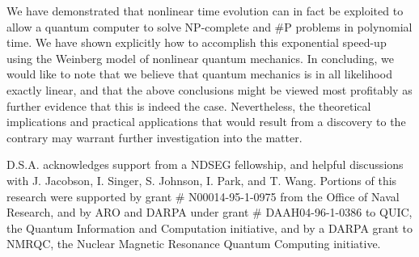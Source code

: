 \documentclass{article}
\begin{document}
We have demonstrated that nonlinear time evolution can in fact be exploited to
allow a quantum computer to solve NP-complete and \#P problems in polynomial
time. We have shown explicitly how to accomplish this exponential speed-up
using the Weinberg model of nonlinear quantum mechanics. In concluding, we
would like to note that we believe that quantum mechanics is in all likelihood
exactly linear, and that the above conclusions might be viewed most profitably
as further evidence that this is indeed the case. Nevertheless, the
theoretical implications and practical applications that would result from a
discovery to the contrary may warrant further investigation into the matter.

D.S.A. acknowledges support from a NDSEG fellowship, and helpful discussions
with J. Jacobson, I. Singer, S. Johnson, I. Park, and T. Wang. Portions of
this research were supported by grant \# N00014-95-1-0975 from the Office of
Naval Research, and by ARO and DARPA under grant \# DAAH04-96-1-0386 to QUIC,
the Quantum Information and Computation initiative, and by a DARPA grant to
NMRQC, the Nuclear Magnetic Resonance Quantum Computing initiative.

\pagebreak 
\end{document}
